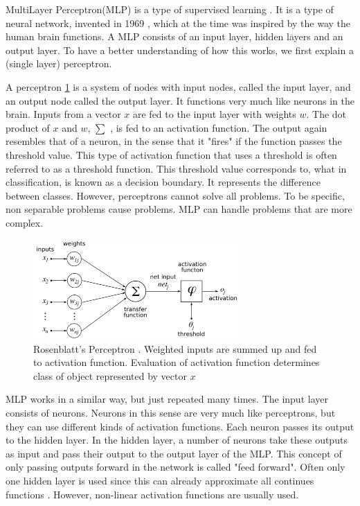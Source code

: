 MultiLayer Perceptron(MLP) is a type of supervised learning \cite{michie1994machine}. It is a type of neural network, invented in 1969 \cite{minsky1969perceptions}, which at the time  was inspired by the way the human brain functions. A MLP consists of an input layer, hidden layers and an output layer. To have a better understanding of how this works, we first explain a (single layer) perceptron\cite{rosenblatt1958perceptron}. 

A perceptron \ref{fig:perceptron} is a system of nodes with input nodes, called the input layer, and an output node called the output layer. It functions very much like neurons in the brain. Inputs from a vector $x$ are fed to the input layer with weights $w$. The dot product of $x$ and $w$, $\sum$ ,  is fed to an activation function. The output again resembles that of a neuron, in the sense that it "fires" if the function passes the threshold value. This type of activation function that uses a threshold is often referred to as a threshold function. This threshold value corresponds to, what in classification, is known as a decision boundary. It represents the difference between classes. However, perceptrons cannot solve all problems. To be specific, non separable problems cause problems. MLP can handle problems that are more complex. \\
\begin{figure}[H]
    \includegraphics[width=80mm]{./img/perceptron.png}
    \caption{\footnotesize{Rosenblatt's Perceptron \cite{wikiPerceptronPNG}. Weighted inputs are summed up and fed to activation function. Evaluation of activation function determines class of object represented by vector $x$}}
    \label{fig:perceptron}
\end{figure}

MLP works in a similar way, but just repeated many times. The input layer consists of neurons. Neurons in this sense are very much like perceptrons, but they can use different kinds of activation functions. Each neuron passes its output to the hidden layer. In the hidden layer, a number of neurons take these outputs as input and pass their output to the output layer of the MLP. This concept of only passing outputs forward in the network is called "feed forward". Often only one hidden layer is used since this can already approximate all continues functions \cite{cybenko1989approximation}. However, non-linear activation functions are usually used. 

